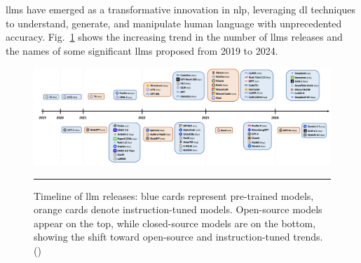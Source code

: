 \glspl{llm} have emerged as a transformative innovation in \gls{nlp}, leveraging \gls{dl} techniques to understand, generate, and manipulate human language with unprecedented accuracy.
Fig.~\ref{fig:llms-over-the-years} shows the increasing trend in the number of \glspl{llm} releases and the names of some significant \glspl{llm} proposed from 2019 to 2024.

\begin{figure}[htbp]
    \centering
 \includegraphics[width=\textwidth]{figures/literature-review/llms-over-the-years.png}
     \rule{35em}{0.5pt}
    \caption{Timeline of \gls{llm} releases: blue cards represent pre-trained models, orange cards denote instruction-tuned models. Open-source models appear on the top, while closed-source models are on the bottom, showing the shift toward open-source and instruction-tuned trends. (\textcite{Naveed2023})}
 \label{fig:llms-over-the-years}
\end{figure}

